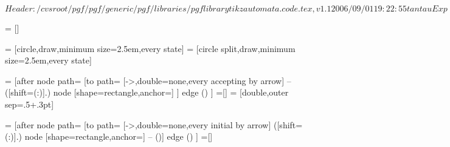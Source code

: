 \ProvidesFileRCS[v\pgfversion] $Header: /cvsroot/pgf/pgf/generic/pgf/libraries/pgflibrarytikzautomata.code.tex,v 1.1 2006/09/01 19:22:55 tantau Exp $

%




=           []

=  [circle,draw,minimum size=2.5em,every state]
=     [circle split,draw,minimum size=2.5em,every state]

=    [after node path=
{
  {
    [to path=
    {
      [->,double=none,every accepting by arrow]
      --
      ([shift=(\tikz@accepting@angle:\tikz@accepting@distance)]\tikztostart.\tikz@accepting@angle)
          node [shape=rectangle,anchor=\tikz@accepting@anchor] {\tikz@accepting@text}
      }]
    edge ()
  }
}]
=[]
= [double,outer sep=.5\pgflinewidth+.3pt] %

=   [after node path=
{
  {
    [to path=
    {
      [->,double=none,every initial by arrow]
      ([shift=(\tikz@initial@angle:\tikz@initial@distance)]\tikztostart.\tikz@initial@angle)
          node [shape=rectangle,anchor=\tikz@initial@anchor] {\tikz@initial@text}
        -- (\tikztostart)}]
    edge ()
  }
}]
=[]





\def\tikz@initial@text{start}
\def\tikz@accepting@text{}

\def\tikz@initial@distance{3ex}
\def\tikz@accepting@distance{3ex}

